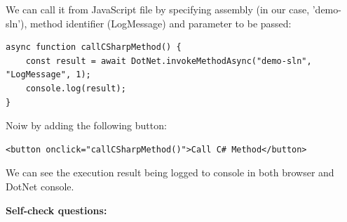We can call it from JavaScript file by specifying assembly (in our case, 'demo-sln'), method identifier (LogMessage) and parameter to be passed:

\begin{lstlisting}
async function callCSharpMethod() {
    const result = await DotNet.invokeMethodAsync("demo-sln", "LogMessage", 1);
    console.log(result);
}
\end{lstlisting}

Noiw by adding the following button:

\begin{lstlisting}
<button onclick="callCSharpMethod()">Call C# Method</button>
\end{lstlisting}

We can see the execution result being logged to console in both browser and DotNet console.


\medskip 

\textbf{Self-check questions:}

